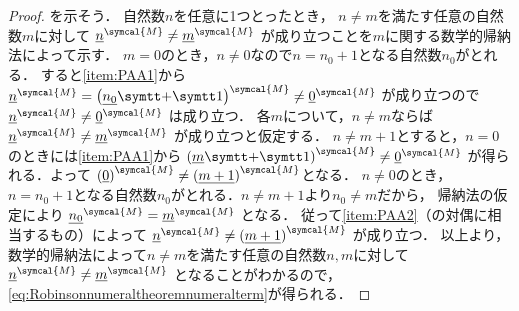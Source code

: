 \begin{proof}
	を示そう．
	自然数\(n\)を任意に1つとったとき，
	\(n \neq m\)を満たす任意の自然数\(m\)に対して
	\(
	\interpretation{\symcal{M}}{\numeral{n}} \neq \interpretation{\symcal{M}}{\numeral{m}}
	\)
	が成り立つことを\(m\)に関する数学的帰納法によって示す．
	\(m = 0\)のとき，\(n \neq 0\)なので\(n = n_0 + 1\)となる自然数\(n_0\)がとれる．
	すると\cref{item:PAA1}から
	\(
	\interpretation{\symcal{M}}{\numeral{n}} = \interpretation{\symcal{M}}{\paren{\numeral{n_0} \obj{+} \obj{1}}} \neq \interpretation{\symcal{M}}{\numeral{0}}
	\)
	が成り立つので
	\(
	\interpretation{\symcal{M}}{\numeral{n}} \neq \interpretation{\symcal{M}}{\numeral{0}}
	\)
	は成り立つ．
	各\(m\)について，\(n \neq m\)ならば
	\(
	\interpretation{\symcal{M}}{\numeral{n}} \neq \interpretation{\symcal{M}}{\numeral{m}}
	\)
	が成り立つと仮定する．
	\(n \neq m + 1\)とすると，\(n = 0\)のときには\cref{item:PAA1}から
	\(
	\interpretation{\symcal{M}}{\paren{\numeral{m} \obj{+} \obj{1}}} \neq \interpretation{\symcal{M}}{\numeral{0}}
	\)
	が得られる．よって
	\(
	\interpretation{\symcal{M}}{\paren{\numeral{0}}} \neq \interpretation{\symcal{M}}{\paren{\numeral{m + 1}}}\)となる．
	\(n \neq 0\)のとき，\(n = n_0 + 1\)となる自然数\(n_0\)がとれる．\(n \neq m + 1\)より\(n_0 \neq m\)だから，
	帰納法の仮定により
	\(
	\interpretation{\symcal{M}}{\numeral{n_0}} = \interpretation{\symcal{M}}{\numeral{m}}
	\)
	となる．
	従って\cref{item:PAA2}（の対偶に相当するもの）によって
	\(
	\interpretation{\symcal{M}}{\numeral{n}} \neq \interpretation{\symcal{M}}{\paren{\numeral{m + 1}}}
	\)
	が成り立つ．
	以上より，数学的帰納法によって\(n \neq m\)を満たす任意の自然数\(n, m\)に対して
	\(
	\interpretation{\symcal{M}}{\numeral{n}} \neq \interpretation{\symcal{M}}{\numeral{m}}
	\)
	となることがわかるので，\cref{eq:Robinsonnumeraltheoremnumeralterm}が得られる．


\end{proof}
